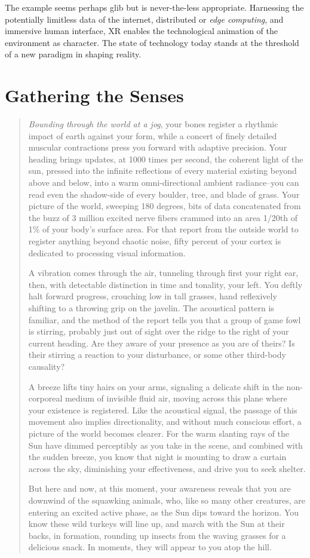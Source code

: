 \documentclass{UIdahoMastersThesis}
\begin{document}
The example seems perhaps glib but is never-the-less appropriate. Harnessing the potentially limitless data of the internet, distributed or \emph{edge computing}, and immersive human interface, \ac{XR} enables the technological animation of the environment as character. The state of technology today stands at the threshold of a new paradigm in shaping reality.


\section{Gathering the Senses}

\begin{quote}
{
\textit{Bounding through the world at a jog}, your bones register a rhythmic impact of earth against your form, while a concert of finely detailed muscular contractions press you forward with adaptive precision. Your heading brings updates, at 1000 times per second, the coherent light of the sun, pressed into the infinite reflections of every material existing beyond above and below, into a warm omni-directional ambient radiance--you can read even the shadow-side of every boulder, tree, and blade of grass. Your picture of the world, sweeping 180 degrees, bits of data concatenated from the buzz of 3 million excited nerve fibers crammed into an area 1/20th of 1\% of your body's surface area. For that report from the outside world to register anything beyond chaotic noise, fifty percent of your cortex is dedicated to processing visual information.

A vibration comes through the air, tunneling through first your right ear, then, with detectable distinction in time and tonality, your left. You deftly halt forward progress, crouching low in tall grasses, hand reflexively shifting to a throwing grip on the javelin. The acoustical pattern is familiar, and the method of the report tells you that a group of game fowl is stirring, probably just out of sight over the ridge to the right of your current heading. Are they aware of your presence as you are of theirs? Is their stirring a reaction to your disturbance, or some other third-body causality?

A breeze lifts tiny hairs on your arms, signaling a delicate shift in the non-corporeal medium of invisible fluid air, moving across this plane where your existence is registered. Like the acoustical signal, the passage of this movement also implies directionality, and without much conscious effort, a picture of the world becomes clearer. For the warm slanting rays of the Sun have dimmed perceptibly as you take in the scene, and combined with the sudden breeze, you know that night is mounting to draw a curtain across the sky, diminishing your effectiveness, and drive you to seek shelter.
 
But here and now, at this moment, your awareness reveals that you are downwind of the squawking animals, who, like so many other creatures, are entering an excited active phase, as the Sun dips toward the horizon. You know these wild turkeys will line up, and march with the Sun at their backs, in formation, rounding up insects from the waving grasses for a delicious snack. In moments, they will appear to you atop the hill.
}
\end{quote}
\end{document}
